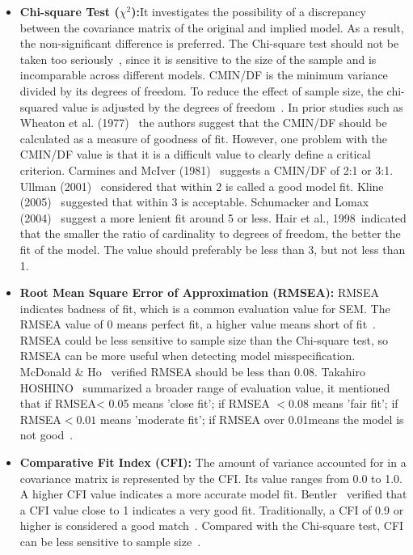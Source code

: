 \begin{itemize}
\item \textbf{Chi-square Test ($\chi^2$):}It investigates the possibility of a discrepancy between the covariance matrix of the original and implied model. As a result, the non-significant difference is preferred. The Chi-square test should not be taken too seriously~\cite{ref22,ref23,ref24}, since it is sensitive to the size of the sample and is incomparable across different models. CMIN/DF is the minimum variance divided by its degrees of freedom. To reduce the effect of sample size, the chi-squared value is adjusted by the degrees of freedom~\cite{ref41}. In prior studies such as Wheaton et al. (1977)~\cite{ref24} the authors suggest that the CMIN/DF should be calculated as a measure of goodness of fit. However, one problem with the CMIN/DF value is that it is a difficult value to clearly define a critical criterion. Carmines and McIver (1981)~\cite{ref36} suggests a CMIN/DF of 2:1 or 3:1. Ullman (2001)~\cite{ref37} considered that within 2 is called a good model fit. Kline (2005)~\cite{ref38} suggested that within 3 is acceptable. Schumacker and Lomax (2004)~\cite{ref39} suggest a more lenient fit around 5 or less. Hair et al., 1998~\cite{ref40}indicated that the smaller the ratio of cardinality to degrees of freedom, the better the fit of the model. The value should preferably be less than 3, but not less than 1.
\item \textbf{Root Mean Square Error of Approximation (RMSEA):}  RMSEA indicates badness of fit, which is a common evaluation value for SEM. The RMSEA value of 0 means perfect fit, a higher value means short of fit~\cite{ref25}. RMSEA could be less sensitive to sample size than the Chi-square test, so RMSEA can be more useful when detecting model misspecification. McDonald \& Ho~\cite{ref2} verified RMSEA should be less than 0.08. Takahiro HOSHINO~\cite{SEMres} summarized a broader range of evaluation value, it mentioned that if RMSEA< 0.05 means 'close fit'; if RMSEA $< 0.08$ means 'fair fit'; if RMSEA$< 0.01$ means 'moderate fit'; if RMSEA over 0.01means the model is not good~\cite{ref3,ref4,ref5}. 
\item \textbf{Comparative Fit Index (CFI):} The amount of variance accounted for in a covariance matrix is represented by the CFI. Its value ranges from 0.0 to 1.0. A higher CFI value indicates a more accurate model fit. Bentler~\cite{ref6} verified that a CFI value close to 1 indicates a very good fit. Traditionally, a CFI of 0.9 or higher is considered a good match~\cite{ref43,ref44}. Compared with the Chi-square test, CFI can be less sensitive to sample size~\cite{ref26}.
\end{itemize}

